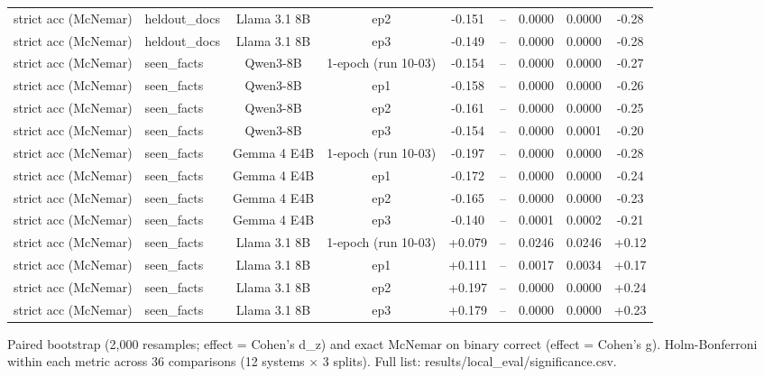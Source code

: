 \begin{table}[t]
{\begin{tabular}{llccccccc}
strict acc (McNemar) & heldout\_docs & Llama 3.1 8B & ep2 & -0.151 & – & 0.0000 & 0.0000 & -0.28 \\
strict acc (McNemar) & heldout\_docs & Llama 3.1 8B & ep3 & -0.149 & – & 0.0000 & 0.0000 & -0.28 \\
strict acc (McNemar) & seen\_facts & Qwen3-8B & 1-epoch (run 10-03) & -0.154 & – & 0.0000 & 0.0000 & -0.27 \\
strict acc (McNemar) & seen\_facts & Qwen3-8B & ep1 & -0.158 & – & 0.0000 & 0.0000 & -0.26 \\
strict acc (McNemar) & seen\_facts & Qwen3-8B & ep2 & -0.161 & – & 0.0000 & 0.0000 & -0.25 \\
strict acc (McNemar) & seen\_facts & Qwen3-8B & ep3 & -0.154 & – & 0.0000 & 0.0001 & -0.20 \\
strict acc (McNemar) & seen\_facts & Gemma 4 E4B & 1-epoch (run 10-03) & -0.197 & – & 0.0000 & 0.0000 & -0.28 \\
strict acc (McNemar) & seen\_facts & Gemma 4 E4B & ep1 & -0.172 & – & 0.0000 & 0.0000 & -0.24 \\
strict acc (McNemar) & seen\_facts & Gemma 4 E4B & ep2 & -0.165 & – & 0.0000 & 0.0000 & -0.23 \\
strict acc (McNemar) & seen\_facts & Gemma 4 E4B & ep3 & -0.140 & – & 0.0001 & 0.0002 & -0.21 \\
strict acc (McNemar) & seen\_facts & Llama 3.1 8B & 1-epoch (run 10-03) & +0.079 & – & 0.0246 & 0.0246 & +0.12 \\
strict acc (McNemar) & seen\_facts & Llama 3.1 8B & ep1 & +0.111 & – & 0.0017 & 0.0034 & +0.17 \\
strict acc (McNemar) & seen\_facts & Llama 3.1 8B & ep2 & +0.197 & – & 0.0000 & 0.0000 & +0.24 \\
strict acc (McNemar) & seen\_facts & Llama 3.1 8B & ep3 & +0.179 & – & 0.0000 & 0.0000 & +0.23 \\
\bottomrule
\end{tabular}}
\par\smallskip\footnotesize Paired bootstrap (2,000 resamples; effect = Cohen's d\_z) and exact McNemar on binary correct (effect = Cohen's g). Holm-Bonferroni within each metric across 36 comparisons (12 systems $\times$ 3 splits). Full list: results/local\_eval/significance.csv.
\end{table}
